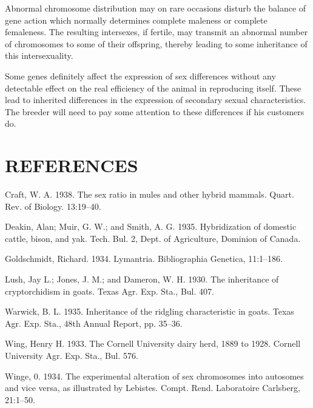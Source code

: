 Abnormal chromosome distribution may on rare occasions disturb
the balance of gene action which normally determines complete maleness
or complete femaleness. The resulting intersexes, if fertile, may
transmit an abnormal number of chromosomes to some of their offspring,
thereby leading to some inheritance of this intersexuality.

Some genes definitely affect the expression of sex differences without
any detectable effect on the real efficiency of the animal in reproducing
itself. These lead to inherited differences in the expression of
secondary sexual characteristics. The breeder will need to pay some
attention to these differences if his customers do.

\section*{REFERENCES}

\begin{hangparas}{0.5in}{1}%
Craft, W. A. 1938. The sex ratio in mules and other hybrid mammals. Quart. Rev.
of Biology. 13:19--40.

Deakin, Alan; Muir, G. W.; and Smith, A. G. 1935. Hybridization of domestic cattle,
bison, and yak. Tech. Bul. 2, Dept. of Agriculture, Dominion of Canada.

Goldschmidt, Richard. 1934. Lymantria. Bibliographia Genetica, 11:1--186.

Lush, Jay L.; Jones, J. M.; and Dameron, W. H. 1930. The inheritance of cryptorchidism
in goats. Texas Agr. Exp. Sta., Bul. 407.

Warwick, B. L. 1935. Inheritance of the ridgling characteristic in goats. Texas Agr.
Exp. Sta., 48th Annual Report, pp. 35--36.

Wing, Henry H. 1933. The Cornell University dairy herd, 1889 to 1928. Cornell
University Agr. Exp. Sta., Bul. 576.

Winge, 0. 1934. The experimental alteration of sex chromosomes into autosomes
and vice versa, as illustrated by Lebistes. Compt. Rend. Laboratoire Carlsberg,
21:1--50.
\end{hangparas}